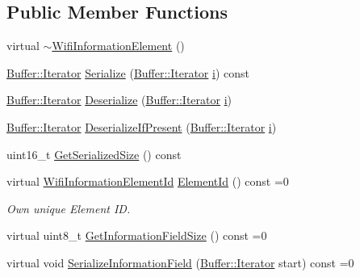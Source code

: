 \subsection*{Public Member Functions}
\begin{DoxyCompactItemize}
\item 
virtual \hyperlink{classns3_1_1WifiInformationElement_ae93bd0b081b3d1666a8846e2b0158cf2}{$\sim$\+Wifi\+Information\+Element} ()
\item 
\hyperlink{classns3_1_1Buffer_1_1Iterator}{Buffer\+::\+Iterator} \hyperlink{classns3_1_1WifiInformationElement_a2f43932681fae6e2bc7a978e9493811e}{Serialize} (\hyperlink{classns3_1_1Buffer_1_1Iterator}{Buffer\+::\+Iterator} \hyperlink{lte__uplink__power__control_8m_a6f6ccfcf58b31cb6412107d9d5281426}{i}) const 
\item 
\hyperlink{classns3_1_1Buffer_1_1Iterator}{Buffer\+::\+Iterator} \hyperlink{classns3_1_1WifiInformationElement_a533a553c7a33a4870f1819b25d43d15b}{Deserialize} (\hyperlink{classns3_1_1Buffer_1_1Iterator}{Buffer\+::\+Iterator} \hyperlink{lte__uplink__power__control_8m_a6f6ccfcf58b31cb6412107d9d5281426}{i})
\item 
\hyperlink{classns3_1_1Buffer_1_1Iterator}{Buffer\+::\+Iterator} \hyperlink{classns3_1_1WifiInformationElement_a8ce15156403cf18af657c4bee2e071aa}{Deserialize\+If\+Present} (\hyperlink{classns3_1_1Buffer_1_1Iterator}{Buffer\+::\+Iterator} \hyperlink{lte__uplink__power__control_8m_a6f6ccfcf58b31cb6412107d9d5281426}{i})
\item 
uint16\+\_\+t \hyperlink{classns3_1_1WifiInformationElement_af4f3be1989f9c54d2137e3d4bceb4788}{Get\+Serialized\+Size} () const 
\item 
virtual \hyperlink{namespacens3_aeb185e0c8a60816016bca079f1420478}{Wifi\+Information\+Element\+Id} \hyperlink{classns3_1_1WifiInformationElement_a0c16b85dc0c63baf7fc437ddbc13ada6}{Element\+Id} () const =0
\begin{DoxyCompactList}\small\item\em Own unique Element ID. \end{DoxyCompactList}\item 
virtual uint8\+\_\+t \hyperlink{classns3_1_1WifiInformationElement_a04af58633c58364e6b8d0ae2a7d777b2}{Get\+Information\+Field\+Size} () const =0
\item 
virtual void \hyperlink{classns3_1_1WifiInformationElement_aaa9fe963ad89df58b8980eb94ace2a7c}{Serialize\+Information\+Field} (\hyperlink{classns3_1_1Buffer_1_1Iterator}{Buffer\+::\+Iterator} start) const =0
\item 

\end{DoxyCompactItemize}
